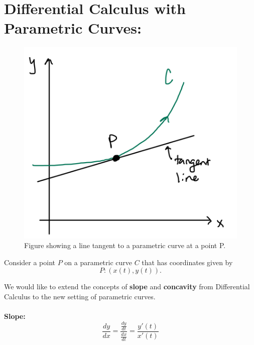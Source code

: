 \section*{Differential Calculus with Parametric Curves:}


\begin{figure}[!h]
\includegraphics[width=\textwidth]{parametric-tangent.png}
\caption{Figure showing a line tangent to a parametric curve at a point P.}
\end{figure}

Consider a point \(P\) on a parametric curve \(C\) that has coordinates given by
\[
P: (x(t), y(t)).
\]

We would like to extend the concepts of \textbf{slope} and \textbf{concavity} from Differential Calculus to the new setting of parametric curves.\\~\\
\textbf{Slope:}
\[
\frac{dy}{dx} = \dfrac{\frac{dy}{dt}}{\frac{dx}{dt}} = \dfrac{y'(t)}{x'(t)}\]

